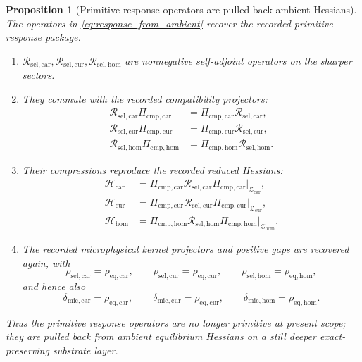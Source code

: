 \documentclass[11pt]{article}
\newcommand{\UltraTensorClass}{\mathscr Z_{\mathrm{car}}}
\newcommand{\UltraRelabelClass}{\mathscr Z_{\mathrm{cur}}}
\newcommand{\UltraFreeClass}{\mathscr Z_{\mathrm{hom}}}
\newcommand{\UltraCarGap}{\delta_{\mathrm{mic,car}}}
\newcommand{\UltraCurGap}{\delta_{\mathrm{mic,cur}}}
\newcommand{\UltraHomGap}{\delta_{\mathrm{mic,hom}}}
\newcommand{\TensorHess}{\mathcal H_{\mathrm{car}}}
\newcommand{\CurHess}{\mathcal H_{\mathrm{cur}}}
\newcommand{\HomHess}{\mathcal H_{\mathrm{hom}}}
\newcommand{\TensorCmpProj}{\Pi_{\mathrm{cmp,car}}}
\newcommand{\CurCmpProj}{\Pi_{\mathrm{cmp,cur}}}
\newcommand{\HomCmpProj}{\Pi_{\mathrm{cmp,hom}}}
\newcommand{\TensorResp}{\mathcal R_{\mathrm{sel,car}}}
\newcommand{\CurResp}{\mathcal R_{\mathrm{sel,cur}}}
\newcommand{\HomResp}{\mathcal R_{\mathrm{sel,hom}}}
\newcommand{\StemCarGap}{\rho_{\mathrm{sel,car}}}
\newcommand{\StemCurGap}{\rho_{\mathrm{sel,cur}}}
\newcommand{\StemHomGap}{\rho_{\mathrm{sel,hom}}}
\newcommand{\EqCarGap}{\rho_{\mathrm{eq,car}}}
\newcommand{\EqCurGap}{\rho_{\mathrm{eq,cur}}}
\newcommand{\EqHomGap}{\rho_{\mathrm{eq,hom}}}
\newtheorem{proposition}{Proposition}
\begin{document}
\begin{proposition}[Primitive response operators are pulled-back ambient Hessians]
\label{prop:response_from_ambient}
The operators in \eqref{eq:response_from_ambient} recover the recorded primitive response package.
\begin{enumerate}
    \item \(\TensorResp,\CurResp,\HomResp\) are nonnegative self-adjoint operators on the sharper sectors.
    \item They commute with the recorded compatibility projectors:
    \begin{equation}
    \begin{aligned}
    \TensorResp\TensorCmpProj&=\TensorCmpProj\TensorResp,
    \\
    \CurResp\CurCmpProj&=\CurCmpProj\CurResp,
    \\
    \HomResp\HomCmpProj&=\HomCmpProj\HomResp.
    \end{aligned}
    \label{eq:response_commute_again}
    \end{equation}
    \item Their compressions reproduce the recorded reduced Hessians:
    \begin{equation}
    \begin{aligned}
    \TensorHess
    &=
    \TensorCmpProj\TensorResp\TensorCmpProj\big|_{\UltraTensorClass},
    \\
    \CurHess
    &=
    \CurCmpProj\CurResp\CurCmpProj\big|_{\UltraRelabelClass},
    \\
    \HomHess
    &=
    \HomCmpProj\HomResp\HomCmpProj\big|_{\UltraFreeClass}.
    \end{aligned}
    \label{eq:hessians_again}
    \end{equation}
    \item The recorded microphysical kernel projectors and positive gaps are recovered again, with
    \begin{equation}
    \StemCarGap=\EqCarGap,\qquad
    \StemCurGap=\EqCurGap,\qquad
    \StemHomGap=\EqHomGap,
    \label{eq:gap_identifications_again}
    \end{equation}
    and hence also
    \begin{equation}
    \UltraCarGap=\EqCarGap,\qquad
    \UltraCurGap=\EqCurGap,\qquad
    \UltraHomGap=\EqHomGap.
    \label{eq:ultra_gap_identifications_again}
    \end{equation}
\end{enumerate}
Thus the primitive response operators are no longer primitive at present scope; they are pulled back from ambient equilibrium Hessians on a still deeper exact-preserving substrate layer.
\end{proposition}
\end{document}
